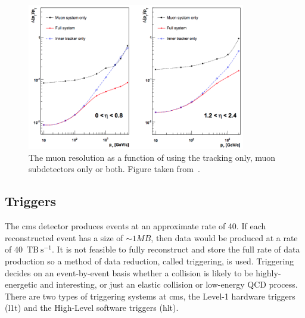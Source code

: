 \begin{figure}[htpb]
	\centering
	\includegraphics[width=0.85\textwidth]{Figures/CMSMUONRES}
	\caption[The muon \pt{} resolution as a function of \pt{} using the tracking only, muon subdetectors only or both.]{The muon \pt{} resolution as a function of \pt{} using the tracking only, muon subdetectors only or both. Figure taken from~\cite{CMSExperiment}.}
	\label{fig:CMSMuonRes}
\end{figure}

\subsection{Triggers}
\label{ssec:Trig}

The \acrshort{cms} detector produces events at an approximate rate of 40\MHz{}. 
If each reconstructed event has a size of $\sim1\unit{MB}$, then data would be produced at a rate of 40~$\mathrm{TB}~\mathrm{s}^{-1}$. 
It is not feasible to fully reconstruct and store the full rate of data production so a method of data reduction, called triggering, is used. 
Triggering decides on an event-by-event basis whether a collision is likely to be highly-energetic and interesting, or just an elastic collision or low-energy QCD process. 
There are two types of triggering systems at \acrshort{cms}, the Level-1 hardware triggers (\acrshort{l1t}) and the High-Level software triggers (\acrshort{hlt}). 

